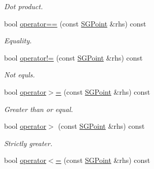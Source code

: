 \begin{DoxyCompactItemize}
\begin{DoxyCompactList}\small\item\em Dot product. \end{DoxyCompactList}\item 
\hypertarget{class_s_g_point_ab3d2eb16f79a746cce7763a4bf0938d1}{bool \hyperlink{class_s_g_point_ab3d2eb16f79a746cce7763a4bf0938d1}{operator==} (const \hyperlink{class_s_g_point}{S\+G\+Point} \&rhs) const }\label{class_s_g_point_ab3d2eb16f79a746cce7763a4bf0938d1}

\begin{DoxyCompactList}\small\item\em Equality. \end{DoxyCompactList}\item 
\hypertarget{class_s_g_point_ac548c65149f9d5e96bfed01e2a4acaa6}{bool \hyperlink{class_s_g_point_ac548c65149f9d5e96bfed01e2a4acaa6}{operator!=} (const \hyperlink{class_s_g_point}{S\+G\+Point} \&rhs) const }\label{class_s_g_point_ac548c65149f9d5e96bfed01e2a4acaa6}

\begin{DoxyCompactList}\small\item\em Not equls. \end{DoxyCompactList}\item 
\hypertarget{class_s_g_point_a217bb7b589615b96714b4ace0794368b}{bool \hyperlink{class_s_g_point_a217bb7b589615b96714b4ace0794368b}{operator$>$=} (const \hyperlink{class_s_g_point}{S\+G\+Point} \&rhs) const }\label{class_s_g_point_a217bb7b589615b96714b4ace0794368b}

\begin{DoxyCompactList}\small\item\em Greater than or equal. \end{DoxyCompactList}\item 
\hypertarget{class_s_g_point_af25174b953cb6aa24ef0484d6b39329d}{bool \hyperlink{class_s_g_point_af25174b953cb6aa24ef0484d6b39329d}{operator$>$} (const \hyperlink{class_s_g_point}{S\+G\+Point} \&rhs) const }\label{class_s_g_point_af25174b953cb6aa24ef0484d6b39329d}

\begin{DoxyCompactList}\small\item\em Strictly greater. \end{DoxyCompactList}\item 
\hypertarget{class_s_g_point_a8ce2d72b4096a843f8f8537d84f06400}{bool \hyperlink{class_s_g_point_a8ce2d72b4096a843f8f8537d84f06400}{operator$<$=} (const \hyperlink{class_s_g_point}{S\+G\+Point} \&rhs) const }\label{class_s_g_point_a8ce2d72b4096a843f8f8537d84f06400}


\end{DoxyCompactItemize}
